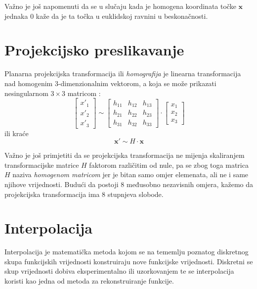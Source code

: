 Važno je još napomenuti da se u slučaju kada je homogena koordinata točke $\mathbf{x}$ jednaka $0$ kaže da je ta točka u euklidskoj ravnini u beskonačnosti.

\section{Projekcijsko preslikavanje}
\label{sec:projPresl}

Planarna projekcijska transformacija ili \textit{homografija} je linearna transformacija nad homogenim 3-dimenzionalnim vektorom, a koja se može prikazati nesingularnom $3 \times 3$ matricom \citep{Hartley2004}:
\begin{equation}
	\label{eq:transLong}
	\left[\begin{matrix}
		x'_1 \\
		x'_2 \\
		x'_3
	\end{matrix}
	\right] \sim \left[\begin{matrix}
		h_{11} & h_{12} & h_{13} \\
		h_{21} & h_{22} & h_{23} \\
		h_{31} & h_{32} & h_{33}
	\end{matrix}
	\right]
	\cdot
	\left[
	\begin{matrix}
		x_1 \\
		x_2 \\
		x_3
	\end{matrix}
	\right]
\end{equation}
ili kraće
\begin{equation}
	\mathbf{x'} \sim H \cdot \mathbf{x}
	\label{eq:transShort}
\end{equation}

Važno je još primjetiti da se projekcijska transformacija ne mijenja skaliranjem transformacijske matrice $H$ faktorom različitim od nule, pa se zbog toga matrica $H$ naziva \textit{homogenom matricom} jer je bitan samo omjer elemenata, ali ne i same njihove vrijednosti. Budući da postoji 8 međusobno nezavisnih omjera, kažemo da projekcijska transformacija ima 8 stupnjeva slobode.

\section{Interpolacija}
\label{sec:interpolacija}

Interpolacija je matematička metoda kojom se na tememlju poznatog diskretnog skupa funkcijskih vrijednosti konstruiraju nove funkcijske vrijednosti. Diskretni se skup vrijednosti dobiva eksperimentalno ili uzorkovanjem te se interpolacija koristi kao jedna od metoda za rekonstruiranje funkcije. \citep{_interpolation_2013}

